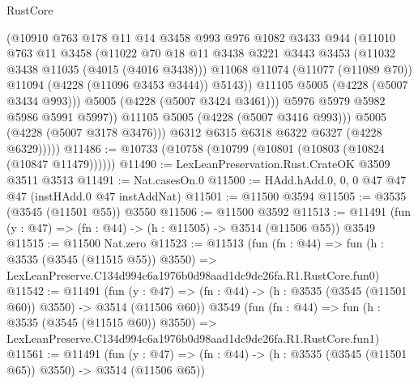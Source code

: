 \begin{lexlean}{RustCore}
\begin{coremodule}
                      (@10910
                        @763
                        @178
                        @11
                        @14
                        @3458
                        @993
                        @976
                        @1082
                        @3433
                        @944
                        (@11010
                          @763
                          @11
                          @3458
                          (@11022
                            @70
                            @18
                            @11
                            @3438
                            @3221
                            @3443
                            @3453
                            (@11032 @3438 @11035 (@4015 (@4016 @3438)))
                            @11068
                            @11074
                            (@11077 (@11089 @70))
                            @11094
                            (@4228 (@11096 @3453 @3444))
                            @5143))
                        @11105
                        @5005
                        (@4228 (@5007 @3434 @993)))
                      @5005
                      (@4228 (@5007 @3424 @3461)))
                    @5976
                    @5979
                    @5982
                    @5986
                    @5991
                    @5997))
                @11105
                @5005
                (@4228 (@5007 @3416 @993)))
              @5005
              (@4228 (@5007 @3178 @3476)))
            @6312
            @6315
            @6318
            @6322
            @6327
            (@4228 @6329)))))
@11486 := @10733 (@10758 (@10799 (@10801 (@10803 (@10824 (@10847 @11479))))))
@11490 := LexLeanPreservation.Rust.CrateOK @3509 @3511 @3513
@11491 := Nat.casesOn.{0}
@11500 := HAdd.hAdd.{0, 0, 0} @47 @47 @47 (instHAdd.{0} @47 instAddNat)
@11501 := @11500 @3594
@11505 := @3535 (@3545 (@11501 @55)) @3550
@11506 := @11500 @3592
@11513 := @11491 (fun (y : @47) => (fn : @44) -> (h : @11505) -> @3514 (@11506 @55)) @3549
@11515 := @11500 Nat.zero
@11523 := @11513
    (fun (fn : @44) =>
    fun (h : @3535 (@3545 (@11515 @55)) @3550) =>
    LexLeanPreserve.C134d994c6a1976b0d98aad1dc9de26fa.R1.RustCore.fun0)
@11542 := @11491
    (fun (y : @47) => (fn : @44) -> (h : @3535 (@3545 (@11501 @60)) @3550) -> @3514 (@11506 @60))
    @3549
    (fun (fn : @44) =>
    fun (h : @3535 (@3545 (@11515 @60)) @3550) =>
    LexLeanPreserve.C134d994c6a1976b0d98aad1dc9de26fa.R1.RustCore.fun1)
@11561 := @11491
    (fun (y : @47) => (fn : @44) -> (h : @3535 (@3545 (@11501 @65)) @3550) -> @3514 (@11506 @65))

\end{coremodule}
\end{lexlean}
